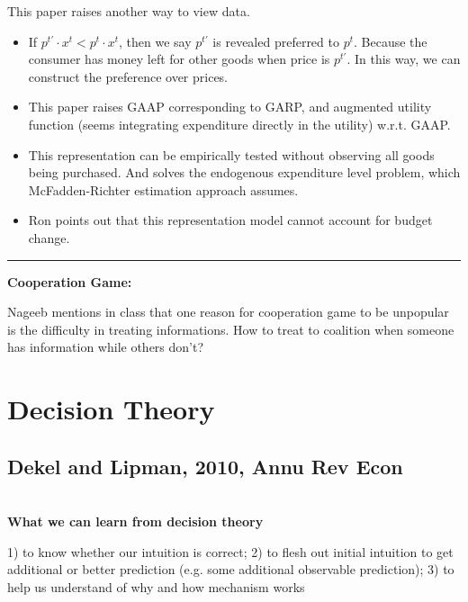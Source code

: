 \documentclass{book}
\theoremstyle{plain}
\theoremstyle{definition}
\newcommand{\myline}{\vspace{3mm} \hrule \vspace{4mm}}
\begin{document}
This paper raises another way to view data.
\begin{itemize}
	\item If $p^{t'}\cdot x^t < p^t \cdot x^t$, then we say $p^{t'}$ is revealed preferred to $p^t$.
	Because the consumer has money left for other goods when price is $p^{t'}$. 
	In this way, we can construct the preference over prices.
	\item This paper raises GAAP corresponding to GARP,
	and augmented utility function (seems integrating expenditure directly in the utility) w.r.t. GAAP.
	\item This representation can be empirically tested without observing all goods being purchased.
	And solves the endogenous expenditure level problem,
	which McFadden-Richter estimation approach assumes.
	\item Ron points out that this representation model cannot account for budget change.
\end{itemize}


\myline

\noindent
\textbf{Cooperation Game:}

Nageeb mentions in class that one reason for cooperation game to be unpopular is the difficulty in treating informations.
How to treat to coalition when someone has information while others don't?













\chapter{Decision Theory} %
\label{cha:decision_theory}

\section{Dekel and Lipman, 2010, Annu Rev Econ} %
\label{sec:dekel_and_lipman_2010_annu_rev_econ}

\textbf{}\\

\noindent
\textbf{What we can learn from decision theory}

1) to know whether our intuition is correct;
2) to flesh out initial intuition to get additional or better prediction (e.g. some additional observable prediction);
3) to help us understand of why and how mechanism works
\end{document}
